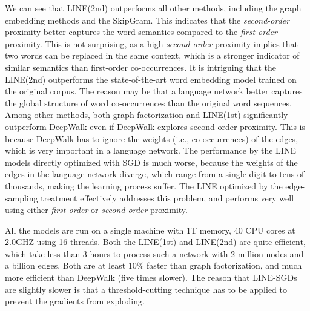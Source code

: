 \documentclass{sig-alternate-2013}
\begin{document}
We can see that LINE(2nd) outperforms all other methods, including the graph embedding methods and the SkipGram. This indicates that the \emph{second-order} proximity better captures the word semantics compared to the \emph{first-order} proximity. This is not surprising, as a high \emph{second-order} proximity implies that two words can be replaced in the same context, which is a stronger indicator of similar semantics than first-order co-occurrences. It is intriguing that the LINE(2nd) outperforms the state-of-the-art word embedding model trained on the original corpus. The reason may be that a language network better captures the global structure of word co-occurrences than the original word sequences. Among other methods, both graph factorization and LINE(1st) significantly outperform DeepWalk even if DeepWalk explores second-order proximity. This is because DeepWalk has to ignore the weights (i.e., co-occurrences) of the edges, which is very important in a language network. The performance by the LINE models directly optimized with SGD is much worse, because the weights of the edges in the language network diverge, which range from a single digit to tens of thousands, making the learning process suffer. The LINE optimized by the edge-sampling treatment effectively addresses this problem, and performs very well using either \emph{first-order} or \emph{second-order} proximity. 

All the models are run on a single machine with 1T memory, 40 CPU cores at 2.0GHZ using 16 threads. Both the LINE(1st) and LINE(2nd) are quite efficient, which take less than 3 hours to process such a network with 2 million nodes and a billion edges. Both are at least 10\% faster than graph factorization, and much more efficient than DeepWalk (five times slower). The reason that LINE-SGDs are slightly slower is that a threshold-cutting technique has to be applied to prevent the gradients from exploding. 
\end{document}
